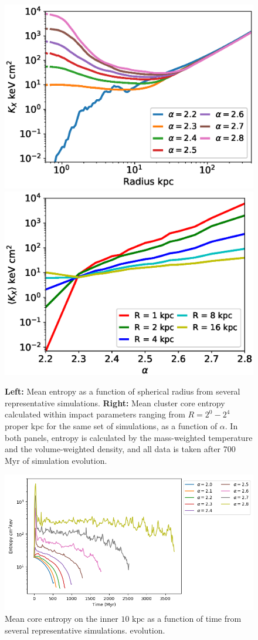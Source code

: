\documentclass[iop,apjl, twocolappendix]{emulateapj}   %
\begin{document}
\begin{figure}
	\begin{center}
		\includegraphics[width=0.49\linewidth]{figures/entropyVradius.eps}
		\includegraphics[width=0.49\linewidth]{figures/entropyValpha.eps}
	\end{center}
	\caption{
		\textbf{Left:}  Mean entropy as a function of spherical radius from
	several representative simulations.  \textbf{Right:} Mean cluster core
	entropy calculated within impact parameters ranging from $R = 2^0 - 2^4$ proper
	kpc for the same set of simulations, as a function of $\alpha$.  In both
	panels, entropy is calculated by the mass-weighted temperature and the
	volume-weighted density, and all data is taken after 700 Myr of simulation
	evolution.}
\end{figure}

\begin{figure}
  \begin{center}
    \includegraphics[width=0.9\linewidth]{figures/core_vw_entropy.png}
  \end{center}
  \caption{Mean core entropy on the inner $10 \text{ kpc}$ as
  a function of time from several representative simulations.  evolution.}
\end{figure}
\end{document}
